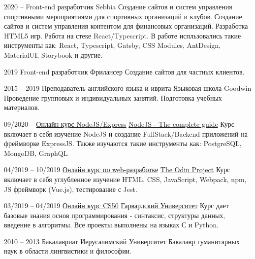 \documentclass[9pt]{developercv} %
\begin{document}
\begin{entrylist}
  \entry
      {2020 --}
      {Front-end разработчик}
      {Sebbia}
      {Создание сайтов и систем управления спортивными мероприятиями для спортивных организаций и клубов. Создание сайтов и систем управления контентом для финансовых организаций. 
      Разработка HTML5 игр. Работа на стеке React/Typescript. В работе испльзовались такие инструменты как: React, Typescript, Gatsby, CSS Modules, AntDesign, MaterialUI, Storybook и другие.}
\end{entrylist}

\begin{entrylist}
  \entry
      {2019}
      {Front-end разработчик}
      {Фрилансер}
      {Создание сайтов для частных клиентов.}
\end{entrylist}

\begin{entrylist}
  \entry
      {2015 -- 2019}
      {Преподаватель английского языка и иврита}
      {Языковая школа Goodwin}
      {Проведение групповых и индивидуальных занятий. Подготовка учебных материалов.}
\end{entrylist}


\begin{entrylist}
  \entry
      {09/2020 --}
      {\href{https://www.udemy.com/course/nodejs-the-complete-guide/}{Онлайн курс NodeJS/Express}}
      {\href{https://www.udemy.com/course/nodejs-the-complete-guide/}{NodeJS - The complete guide}}
      {Курс включает в себя изучение NodeJS и создание FullStack/Backend приложений на фреймворке ExpressJS. Также изучаются такие инструменты как: PostgreSQL, MongoDB, GraphQL}

  \entry
      {04/2019 -- 10/2019}
      {\href{https://www.theodinproject.com}{Онлайн курс по web-разработке}}
      {\href{https://www.theodinproject.com}{The Odin Project}}
      {Курс включает в себя углубленное изучение HTML, CSS, JavaScript, Webpack, npm, JS фреймворк (Vue.js), тестирование с Jest.}

  \entry
      {03/2019 -- 04/2019}
      {\href{https://www.edx.org/course/cs50s-introduction-to-computer-science}{Онлайн курс CS50}}
      {\href{https://www.edx.org/course/cs50s-introduction-to-computer-science}{Гарвардский Университет}}
      {Курс дает базовые знания основ программирования - синтаксис, структуры данных, введение в алгоритмы. Все проекты выполнены на языках С и Python.}

  \entry
      {2010 -- 2013}
      {Бакалавриат}
      {Иерусалимский Университет}
      {Бакалавр гуманитарных наук в области лингвистики и философии.}
\end{entrylist}
\end{document}
